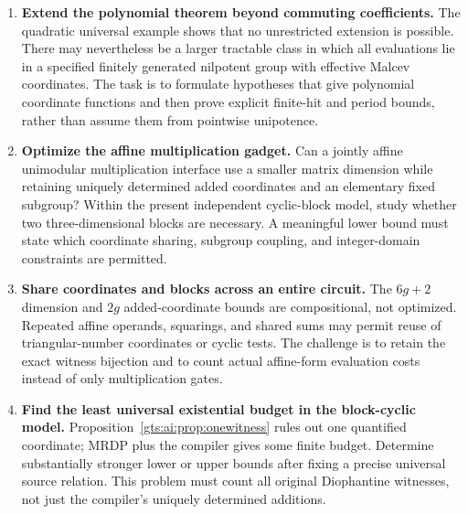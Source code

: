 \documentclass[11pt,letterpaper]{article}
\theoremstyle{definition}
\theoremstyle{remark}
\begin{document}
\begin{enumerate}[label=\textbf{\arabic*.},leftmargin=*]
\item \textbf{Extend the polynomial theorem beyond commuting coefficients.}
The quadratic universal example shows that no unrestricted extension is possible. There may nevertheless be a larger tractable class in which all evaluations lie in a specified finitely generated nilpotent group with effective Malcev coordinates. The task is to formulate hypotheses that give polynomial coordinate functions and then prove explicit finite-hit and period bounds, rather than assume them from pointwise unipotence.

\item \textbf{Optimize the affine multiplication gadget.}
Can a jointly affine unimodular multiplication interface use a smaller matrix dimension while retaining uniquely determined added coordinates and an elementary fixed subgroup? Within the present independent cyclic-block model, study whether two three-dimensional blocks are necessary. A meaningful lower bound must state which coordinate sharing, subgroup coupling, and integer-domain constraints are permitted.

\item \textbf{Share coordinates and blocks across an entire circuit.}
The $6g+2$ dimension and $2g$ added-coordinate bounds are compositional, not optimized. Repeated affine operands, squarings, and shared sums may permit reuse of triangular-number coordinates or cyclic tests. The challenge is to retain the exact witness bijection and to count actual affine-form evaluation costs instead of only multiplication gates.

\item \textbf{Find the least universal existential budget in the block-cyclic model.}
Proposition~\ref{gts:ai:prop:onewitness} rules out one quantified coordinate; MRDP plus the compiler gives some finite budget. Determine substantially stronger lower or upper bounds after fixing a precise universal source relation. This problem must count all original Diophantine witnesses, not just the compiler's uniquely determined additions.


\end{enumerate}
\end{document}
